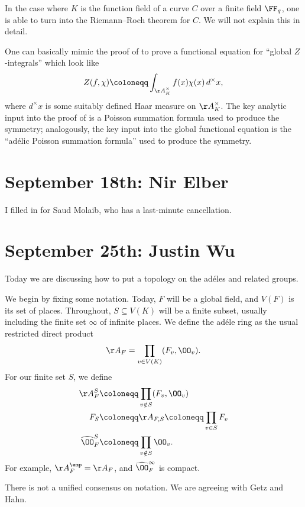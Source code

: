 \documentclass{article}
\begin{document}
\begin{remark}[Reed]
	In the case where $K$ is the function field of a curve $C$ over a finite field $\FF_q$, one is able to turn  into the Riemann--Roch theorem for $C$. We will not explain this in detail.
\end{remark}
\begin{remark}
	One can basically mimic the proof of  to prove a functional equation for ``global $Z$-integrals'' which look like
	\[Z(f,\chi)\coloneqq\int_{\AA_K^\times}f(x)\chi(x)\,d^\times x,\]
	where $d^\times x$ is some suitably defined Haar measure on $\AA_K^\times$. The key analytic input into the proof of  is a Poisson summation formula used to produce the symmetry; analogously, the key input into the global functional equation is the ``ad\'elic Poisson summation formula''  used to produce the symmetry.
\end{remark}

\section{September 18th: Nir Elber}
I filled in for Saud Molaib, who has a last-minute cancellation.




\section{September 25th: Justin Wu}
Today we are discussing how to put a topology on the ad\'eles and related groups.

We begin by fixing some notation. Today, $F$ will be a global field, and $V(F)$ is its set of places. Throughout, $S\subseteq V(K)$ will be a finite subset, usually including the finite set $\infty$ of infinite places. We define the ad\'ele ring as the usual restricted direct product
\[\AA_F=\prod_{v\in V(K)}(F_v,\OO_v).\]
For our finite set $S$, we define
\begin{align*}
	\AA_F^S &\coloneqq \prod_{v\notin S}(F_v,\OO_v) \\
	F_S &\coloneqq \AA_{F,S}\coloneqq\prod_{v\in S}F_v \\
	\widehat\OO_F^S &\coloneqq\prod_{v\notin S}\OO_v.
\end{align*}
For example, $\AA_F^\emp=\AA_F$, and $\widehat\OO_F^\infty$ is compact.
\begin{remark}
	There is not a unified consensus on notation. We are agreeing with Getz and Hahn.
\end{remark}
\end{document}
